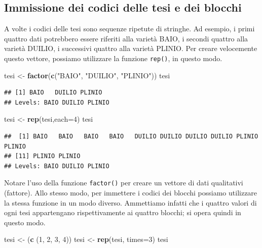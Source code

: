 \documentclass[a4paper,12pt,oneside]{book}
\newenvironment{Shaded}{\begin{snugshade}}{\end{snugshade}}
\newcommand{\KeywordTok}[1]{\textcolor[rgb]{0.13,0.29,0.53}{\textbf{#1}}}
\newcommand{\DataTypeTok}[1]{\textcolor[rgb]{0.13,0.29,0.53}{#1}}
\newcommand{\DecValTok}[1]{\textcolor[rgb]{0.00,0.00,0.81}{#1}}
\newcommand{\StringTok}[1]{\textcolor[rgb]{0.31,0.60,0.02}{#1}}
\newcommand{\NormalTok}[1]{#1}
\begin{document}
\subsection{Immissione dei codici delle tesi e dei
blocchi}\label{immissione-dei-codici-delle-tesi-e-dei-blocchi}

A volte i codici delle tesi sono sequenze ripetute di stringhe. Ad
esempio, i primi quattro dati potrebbero essere riferiti alla varietà
BAIO, i secondi quattro alla varietà DUILIO, i successivi quattro alla
varietà PLINIO. Per creare velocemente questo vettore, possiamo
utilizzare la funzione \texttt{rep()}, in questo modo.

\begin{Shaded}
\begin{Highlighting}[]
\NormalTok{tesi  <-}\StringTok{  }\KeywordTok{factor}\NormalTok{(}\KeywordTok{c}\NormalTok{(}\StringTok{"BAIO"}\NormalTok{, }\StringTok{"DUILIO"}\NormalTok{, }\StringTok{"PLINIO"}\NormalTok{))}
\NormalTok{tesi}
\end{Highlighting}
\end{Shaded}

\begin{verbatim}
## [1] BAIO   DUILIO PLINIO
## Levels: BAIO DUILIO PLINIO
\end{verbatim}

\begin{Shaded}
\begin{Highlighting}[]
\NormalTok{tesi  <-}\StringTok{  }\KeywordTok{rep}\NormalTok{(tesi,}\DataTypeTok{each=}\DecValTok{4}\NormalTok{)}
\NormalTok{tesi}
\end{Highlighting}
\end{Shaded}

\begin{verbatim}
##  [1] BAIO   BAIO   BAIO   BAIO   DUILIO DUILIO DUILIO DUILIO PLINIO PLINIO
## [11] PLINIO PLINIO
## Levels: BAIO DUILIO PLINIO
\end{verbatim}

Notare l'uso della funzione \texttt{factor()} per creare un vettore di
dati qualitativi (fattore). Allo stesso modo, per immettere i codici dei
blocchi possiamo utilizzare la stessa funzione in un modo diverso.
Ammettiamo infatti che i quattro valori di ogni tesi appartengano
rispettivamente ai quattro blocchi; si opera quindi in questo modo.

\begin{Shaded}
\begin{Highlighting}[]
\NormalTok{tesi  <-}\StringTok{  }\NormalTok{(}\KeywordTok{c}\NormalTok{ (}\DecValTok{1}\NormalTok{, }\DecValTok{2}\NormalTok{, }\DecValTok{3}\NormalTok{, }\DecValTok{4}\NormalTok{))}
\NormalTok{tesi <-}\StringTok{ }\KeywordTok{rep}\NormalTok{(tesi, }\DataTypeTok{times=}\DecValTok{3}\NormalTok{)}
\NormalTok{tesi}
\end{Highlighting}
\end{Shaded}
\end{document}
